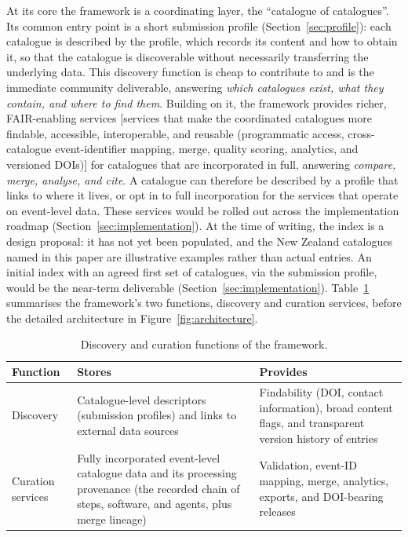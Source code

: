 \documentclass[11pt]{article}
\begin{document}
At its core the framework is a coordinating layer, the ``catalogue of catalogues''. Its common entry point is a short submission profile (Section~\ref{sec:profile}): each catalogue is described by the profile, which records its content and how to obtain it, so that the catalogue is discoverable without necessarily transferring the underlying data. This discovery function is cheap to contribute to and is the immediate community deliverable, answering \emph{which catalogues exist, what they contain, and where to find them}. Building on it, the framework provides richer, FAIR-enabling services [services that make the coordinated catalogues more findable, accessible, interoperable, and reusable (programmatic access, cross-catalogue event-identifier mapping, merge, quality scoring, analytics, and versioned DOIs)] for catalogues that are incorporated in full, answering \emph{compare, merge, analyse, and cite}. A catalogue can therefore be described by a profile that links to where it lives, or opt in to full incorporation for the services that operate on event-level data. These services would be rolled out across the implementation roadmap (Section~\ref{sec:implementation}). At the time of writing, the index is a design proposal: it has not yet been populated, and the New Zealand catalogues named in this paper are illustrative examples rather than actual entries. An initial index with an agreed first set of catalogues, via the submission profile, would be the near-term deliverable (Section~\ref{sec:implementation}). 
Table~\ref{tab:functions} summarises the framework's two functions, discovery and curation services, before the detailed architecture in Figure~\ref{fig:architecture}.

\begin{table}[H]
\centering
\small
\caption{Discovery and curation functions of the framework.}
\label{tab:functions}
\setlength{\tabcolsep}{5pt}
\renewcommand{\arraystretch}{1.15}
\begin{tabular}{p{2.4cm} p{5.2cm} p{5.2cm}}
\toprule
\textbf{Function} & \textbf{Stores} & \textbf{Provides} \\
\midrule
Discovery & Catalogue-level descriptors (submission profiles) and links to external data sources & Findability (DOI, contact information), broad content flags, and transparent version history of entries\\
Curation services & Fully incorporated event-level catalogue data and its processing provenance (the recorded chain of steps, software, and agents, plus merge lineage) & Validation, event-ID mapping, merge, analytics, exports, and DOI-bearing releases \\
\bottomrule
\end{tabular}
\end{table}
\end{document}

